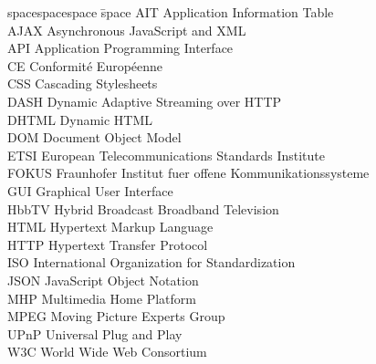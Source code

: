 
\begin{tabbing}
spacespacespace \= space \kill
AIT \> Application Information Table\\
AJAX \> Asynchronous JavaScript and XML\\
API \> Application Programming Interface\\
CE \> Conformité Européenne\\
CSS \> Cascading Stylesheets\\
DASH \> Dynamic Adaptive Streaming over HTTP\\
DHTML \> Dynamic HTML\\
DOM \> Document Object Model\\
ETSI \> European Telecommunications Standards Institute\\
FOKUS \> Fraunhofer Institut fuer offene Kommunikationssysteme\\
GUI \> Graphical User Interface\\
HbbTV \> Hybrid Broadcast Broadband Television\\
HTML \> Hypertext Markup Language\\
HTTP \> Hypertext Transfer Protocol\\
ISO \> International Organization for Standardization\\
JSON \> JavaScript Object Notation\\
MHP \> Multimedia Home Platform\\
MPEG \> Moving Picture Experts Group\\
UPnP \> Universal Plug and Play\\
W3C \> World Wide Web Consortium\\
\end{tabbing}
\endinput
